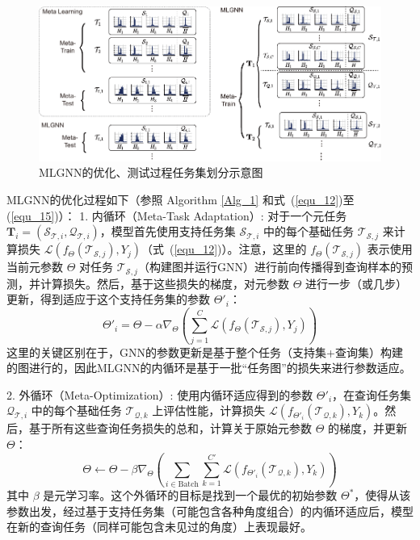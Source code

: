\begin{figure}[h]
    \centering
    \includegraphics[width=\linewidth]{figures/mlgnn.pdf} %
    \caption{MLGNN的优化、测试过程任务集划分示意图}
    \label{fig:dataset_chap3}
\end{figure}

MLGNN的优化过程如下（参照 Algorithm \ref{Alg_1} 和式~(\ref{equ_12})至(\ref{equ_15})）：
1.  内循环（Meta-Task Adaptation）: 对于一个元任务 $\mathbf{T}_i = (\mathcal{S}_{\mathcal{T},i}, \mathcal{Q}_{\mathcal{T},i})$，模型首先使用支持任务集 $\mathcal{S}_{\mathcal{T},i}$ 中的每个基础任务 $\mathcal{T}_{\mathcal{S},j}$ 来计算损失 $\mathcal{L}(f_{\Theta}(\mathcal{T}_{\mathcal{S},j}), Y_j)$（式~(\ref{equ_12})）。注意，这里的 $f_{\Theta}(\mathcal{T}_{\mathcal{S},j})$ 表示使用当前元参数 $\Theta$ 对任务 $\mathcal{T}_{\mathcal{S},j}$（构建图并运行GNN）进行前向传播得到查询样本的预测，并计算损失。然后，基于这些损失的梯度，对元参数 $\Theta$ 进行一步（或几步）更新，得到适应于这个支持任务集的参数 $\Theta'_i$：
    \begin{equation}
        \Theta'_{i} = \Theta - \alpha \nabla_{\Theta} \left( \sum_{j=1}^C \mathcal{L}(f_{\Theta}(\mathcal{T}_{\mathcal{S},j}), Y_j) \right)
        \label{eq:mlgnn_inner_update}
    \end{equation}
    这里的关键区别在于，GNN的参数更新是基于整个任务（支持集+查询集）构建的图进行的，因此MLGNN的内循环是基于一批“任务图”的损失来进行参数适应。

2.  外循环（Meta-Optimization）: 使用内循环适应得到的参数 $\Theta'_i$，在查询任务集 $\mathcal{Q}_{\mathcal{T},i}$ 中的每个基础任务 $\mathcal{T}_{\mathcal{Q},k}$ 上评估性能，计算损失 $\mathcal{L}(f_{\Theta'_i}(\mathcal{T}_{\mathcal{Q},k}), Y_k)$。然后，基于所有这些查询任务损失的总和，计算关于原始元参数 $\Theta$ 的梯度，并更新 $\Theta$：
    \begin{equation}
        \Theta \leftarrow \Theta - \beta \nabla_{\Theta} \left( \sum_{i \in \text{Batch}} \sum_{k=1}^{C'} \mathcal{L}(f_{\Theta'_i}(\mathcal{T}_{\mathcal{Q},k}), Y_k) \right)
        \label{eq:mlgnn_outer_update}
    \end{equation}
    其中 $\beta$ 是元学习率。这个外循环的目标是找到一个最优的初始参数 $\Theta^*$，使得从该参数出发，经过基于支持任务集（可能包含各种角度组合）的内循环适应后，模型在新的查询任务（同样可能包含未见过的角度）上表现最好。

